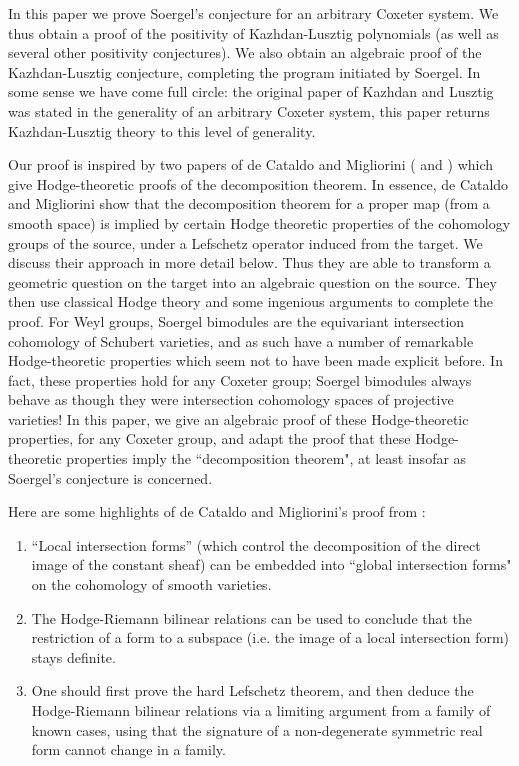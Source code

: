 \documentclass[11pt]{amsart}
\numberwithin{equation}{section}
\theoremstyle{definition}
\theoremstyle{remark}
\begin{document}
In this paper we prove Soergel's conjecture for an arbitrary Coxeter
system. We thus obtain a proof of the
positivity of Kazhdan-Lusztig polynomials (as well as several other
positivity conjectures). We also obtain an algebraic proof of the
Kazhdan-Lusztig conjecture, completing the program initiated by
Soergel. In some sense we have come full circle: the original paper of Kazhdan and Lusztig was stated in the generality of an arbitrary Coxeter system, this paper returns Kazhdan-Lusztig theory to this
level of generality.

Our proof is inspired by two papers of de Cataldo and Migliorini
(\cite{dCM1} and \cite{dCM2}) which give Hodge-theoretic proofs of the
decomposition theorem.  In essence, de Cataldo and Migliorini show that the decomposition theorem for a proper map (from a smooth space) is implied by certain Hodge theoretic properties of the cohomology groups of the source, under a Lefschetz operator induced from the target.
We discuss their approach in more 
detail below. Thus they are able to transform a geometric question on the
target into an algebraic question on the source. They then 
use classical Hodge theory and some ingenious arguments to complete
the proof. For Weyl groups, 
Soergel bimodules are the equivariant intersection
cohomology of Schubert varieties, and as such have a
number of remarkable Hodge-theoretic 
properties which seem not to have been made explicit before.
In fact, these properties hold for any Coxeter group;
Soergel bimodules always behave as though they were intersection
cohomology spaces of projective varieties! In this 
paper, we give an algebraic proof of these Hodge-theoretic properties,
for any Coxeter group, and adapt the proof that these Hodge-theoretic
properties imply the ``decomposition 
theorem", at least insofar as Soergel's conjecture is concerned.

Here are some highlights of de Cataldo and Migliorini's proof from \cite{dCM1}:
\begin{enumerate}
\item ``Local intersection forms'' (which control the decomposition of
  the direct image of
  the constant sheaf) can be embedded into ``global intersection
  forms" on the cohomology of smooth varieties.
\item The Hodge-Riemann bilinear relations can be used to conclude that the restriction of a form to a subspace (i.e. the image of a local intersection form) stays definite.
\item One should first prove the hard Lefschetz theorem, and then
  deduce the Hodge-Riemann bilinear relations via a limiting argument
  from a family of known cases, using that the signature of a non-degenerate symmetric real form cannot change in a family.
\end{enumerate}
\end{document}
